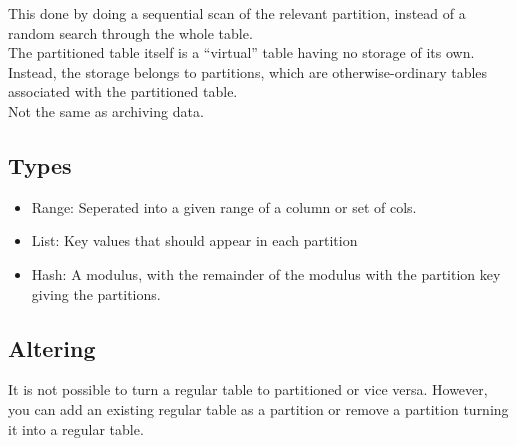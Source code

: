 \documentclass[11pt]{scrartcl} %
\begin{document}
This done by doing a sequential scan of the relevant partition, instead of a random search
through the whole table.\\

The partitioned table itself is a “virtual” table having no storage of its own. 
Instead, the storage belongs to partitions, which are otherwise-ordinary tables associated with 
the partitioned table.\\

Not the same as archiving data.

\subsection{Types}

\begin{itemize}
	\item Range: Seperated into a given range of a column or set of cols.
	\item List: Key values that should appear in each partition
	\item Hash: A modulus, with the remainder of the modulus with the partition key 
	giving the partitions.
\end{itemize}

\subsection{Altering}

It is not possible to turn a regular table to partitioned or vice versa. However,
you can add an existing regular table as a partition or remove a partition turning it 
into a regular table.
\end{document}
